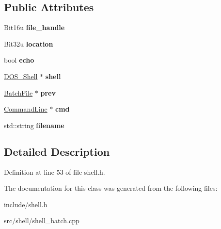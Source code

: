 \subsection*{Public Attributes}
\begin{DoxyCompactItemize}
\item 
\hypertarget{classBatchFile_a0e668547306df551eb7e70baa98241e9}{Bit16u {\bfseries file\-\_\-handle}}\label{classBatchFile_a0e668547306df551eb7e70baa98241e9}

\item 
\hypertarget{classBatchFile_aa9209ce7918ced6ce1a2fc59fff4b0c9}{Bit32u {\bfseries location}}\label{classBatchFile_aa9209ce7918ced6ce1a2fc59fff4b0c9}

\item 
\hypertarget{classBatchFile_ac6faaf367cb17424acd15724a58448ab}{bool {\bfseries echo}}\label{classBatchFile_ac6faaf367cb17424acd15724a58448ab}

\item 
\hypertarget{classBatchFile_a739d699f3d7abf36ae6e85ebe80d80b0}{\hyperlink{classDOS__Shell}{D\-O\-S\-\_\-\-Shell} $\ast$ {\bfseries shell}}\label{classBatchFile_a739d699f3d7abf36ae6e85ebe80d80b0}

\item 
\hypertarget{classBatchFile_a6369bd4d3b07b7661e49aaf43f4ed622}{\hyperlink{classBatchFile}{Batch\-File} $\ast$ {\bfseries prev}}\label{classBatchFile_a6369bd4d3b07b7661e49aaf43f4ed622}

\item 
\hypertarget{classBatchFile_a2b1bcf8ea0fb7f71633708a9886e67ee}{\hyperlink{classCommandLine}{Command\-Line} $\ast$ {\bfseries cmd}}\label{classBatchFile_a2b1bcf8ea0fb7f71633708a9886e67ee}

\item 
\hypertarget{classBatchFile_a2deea964df7496637a1843c66d174189}{std\-::string {\bfseries filename}}\label{classBatchFile_a2deea964df7496637a1843c66d174189}

\end{DoxyCompactItemize}


\subsection{Detailed Description}


Definition at line 53 of file shell.\-h.



The documentation for this class was generated from the following files\-:\begin{DoxyCompactItemize}
\item 
include/shell.\-h\item 
src/shell/shell\-\_\-batch.\-cpp\end{DoxyCompactItemize}
